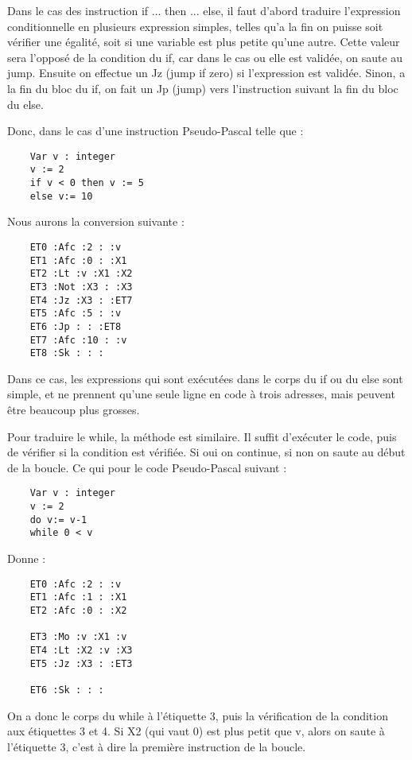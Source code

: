 \documentclass{article}
\begin{document}
Dans le cas des instruction if ... then ... else, il faut d'abord traduire l'expression conditionnelle en plusieurs expression simples, telles qu'a la fin on puisse soit vérifier une égalité, soit si une variable est plus petite qu'une autre.
Cette valeur sera l'opposé de la condition du if, car dans le cas ou elle est validée, on saute au jump. Ensuite on effectue un Jz (jump if zero) si l'expression est validée.
Sinon, a la fin du bloc du if, on fait un Jp (jump) vers l’instruction suivant la fin du bloc du else.

Donc, dans le cas d'une instruction Pseudo-Pascal telle que :
\begin{lstlisting}
    Var v : integer
    v := 2
    if v < 0 then v := 5
    else v:= 10
\end{lstlisting}

Nous aurons la conversion suivante :

\begin{lstlisting}
    ET0 :Afc :2 : :v
    ET1 :Afc :0 : :X1
    ET2 :Lt :v :X1 :X2
    ET3 :Not :X3 : :X3
    ET4 :Jz :X3 : :ET7
    ET5 :Afc :5 : :v
    ET6 :Jp : : :ET8
    ET7 :Afc :10 : :v
    ET8 :Sk : : :
\end{lstlisting}

Dans ce cas, les expressions qui sont exécutées dans le corps du if ou du else sont simple, et ne prennent qu'une seule ligne en code à trois adresses, mais peuvent être beaucoup plus grosses.

\bigbreak

Pour traduire le while, la méthode est similaire. Il suffit d’exécuter le code, puis de vérifier si la condition est vérifiée. Si oui on continue, si non on saute au début de la boucle. Ce qui pour le code Pseudo-Pascal suivant :

\begin{lstlisting}
    Var v : integer
    v := 2
    do v:= v-1
    while 0 < v
\end{lstlisting}

Donne :

\begin{lstlisting}
    ET0 :Afc :2 : :v
    ET1 :Afc :1 : :X1
    ET2 :Afc :0 : :X2

    ET3 :Mo :v :X1 :v
    ET4 :Lt :X2 :v :X3
    ET5 :Jz :X3 : :ET3

    ET6 :Sk : : :
\end{lstlisting}

On a donc le corps du while à l'étiquette 3, puis la vérification de la condition aux étiquettes 3 et 4. Si X2 (qui vaut 0) est plus petit que v, alors on saute à l'étiquette 3, c'est à dire la première instruction de la boucle.
\end{document}
